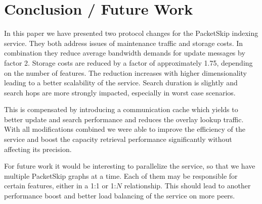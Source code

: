 \section{Conclusion / Future Work}
\label{sec:conclusion}

In this paper we have presented two protocol changes for the PacketSkip indexing service. They both address issues of maintenance traffic and storage costs. In combination they reduce average bandwidth demands for update messages by factor 2. Storage costs are reduced by a factor of approximately 1.75, depending on the number of features. The reduction increases with higher dimensionality leading to a better scalability of the service. Search duration is slightly and search hops are more strongly impacted, especially in worst case scenarios.

This is compensated by introducing a communication cache which yields to better update and search performance and reduces the overlay lookup traffic. With all modifications combined we were able to improve the efficiency of the service and boost the capacity retrieval performance significantly without affecting its precision.

For future work it would be interesting to parallelize the service, so that we have multiple PacketSkip graphs at a time. Each of them may be responsible for certain features, either in a 1:1 or 1:$N$ relationship. This should lead to another performance boost and better load balancing of the service on more peers.
